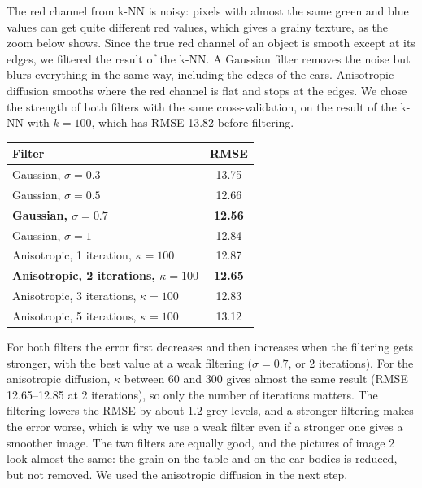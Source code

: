 \documentclass[11pt,a4paper]{article}
\begin{document}
The red channel from k-NN is noisy: pixels with almost the same green and blue values can get quite different red values, which gives a grainy texture, as the zoom below shows. Since the true red channel of an object is smooth except at its edges, we filtered the result of the k-NN. A Gaussian filter removes the noise but blurs everything in the same way, including the edges of the cars. Anisotropic diffusion smooths where the red channel is flat and stops at the edges. We chose the strength of both filters with the same cross-validation, on the result of the k-NN with $k = 100$, which has RMSE 13.82 before filtering.

\begin{center}
\begin{tabular}{lc}
\toprule
Filter & RMSE \\
\midrule
Gaussian, $\sigma = 0.3$ & 13.75 \\
Gaussian, $\sigma = 0.5$ & 12.66 \\
\textbf{Gaussian, $\sigma = 0.7$} & \textbf{12.56} \\
Gaussian, $\sigma = 1$ & 12.84 \\
\midrule
Anisotropic, 1 iteration, $\kappa = 100$ & 12.87 \\
\textbf{Anisotropic, 2 iterations, $\kappa = 100$} & \textbf{12.65} \\
Anisotropic, 3 iterations, $\kappa = 100$ & 12.83 \\
Anisotropic, 5 iterations, $\kappa = 100$ & 13.12 \\
\bottomrule
\end{tabular}
\end{center}

For both filters the error first decreases and then increases when the filtering gets stronger, with the best value at a weak filtering ($\sigma = 0.7$, or 2 iterations). For the anisotropic diffusion, $\kappa$ between 60 and 300 gives almost the same result (RMSE 12.65--12.85 at 2 iterations), so only the number of iterations matters. The filtering lowers the RMSE by about 1.2 grey levels, and a stronger filtering makes the error worse, which is why we use a weak filter even if a stronger one gives a smoother image. The two filters are equally good, and the pictures of image 2 look almost the same: the grain on the table and on the car bodies is reduced, but not removed. We used the anisotropic diffusion in the next step.
\end{document}
